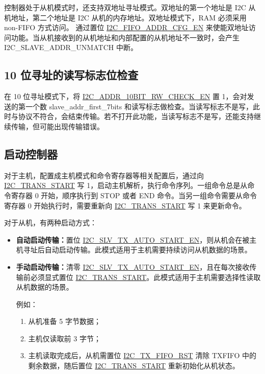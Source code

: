\documentclass[main\_\_CN.tex]{subfiles}
\begin{document}
控制器处于从机模式时，还支持双地址寻址模式。双地址的第一个地址是 I2C 从机地址，第二个地址是 I2C 从机的内存地址。双地址模式下，RAM 必须采用 non-FIFO 方式访问。
通过置位 \hyperref[fielddesc:I2CFIFOADDRCFGEN]{I2C\_FIFO\_ADDR\_CFG\_EN} 来使能双地址访问功能。当从机接收到的从机地址和内部配置的从机地址不一致时，会产生 I2C\_SLAVE\_ADDR\_UNMATCH 中断。
 
\subsection{10 位寻址的读写标志位检查}
在 10 位寻址模式下，将 \hyperref[fielddesc:I2CADDR10BITRWCHECKEN]{I2C\_ADDR\_10BIT\_RW\_CHECK\_EN} 置 1，会对发送的第一个数 slave\_addr\_first\_7bits 和读写标志做检查。当读写标志不是写，此时与协议不符合，会结束传输。若不打开此功能，当读写标志不是写，还能支持继续传输，但可能出现传输错误。

\subsection{启动控制器}
\label{subsubsec:i2c-start}
对于主机，配置成主机模式和命令寄存器等相关配置后，通过向 \hyperref[fielddesc:I2CTRANSSTART]{I2C\_TRANS\_START} 写 1，启动主机解析，执行命令序列。一组命令总是从命令寄存器 0 开始，顺序执行到 STOP 或者 END 命令。当另一组命令需要从命令寄存器 0 开始执行时，需要重新向 \hyperref[fielddesc:I2CTRANSSTART]{I2C\_TRANS\_START} 写 1 来更新命令。

对于从机，有两种启动方式：
\begin{itemize}
    \item \textbf{自动启动传输：}置位 \hyperref[fielddesc:I2CSLVTXAUTOSTARTEN]{I2C\_SLV\_TX\_AUTO\_START\_EN}，则从机会在被主机寻址后自动启动传输。此模式适用于主机需要持续访问从机数据的场景。
    \item \textbf{手动启动传输：}清零 \hyperref[fielddesc:I2CSLVTXAUTOSTARTEN]{I2C\_SLV\_TX\_AUTO\_START\_EN}，且在每次接收传输前必须显式置位 \hyperref[fielddesc:I2CTRANSSTART]{I2C\_TRANS\_START}。此模式适用于主机需要选择性读取从机数据的场景。

例如：
\begin{enumerate}
\item 从机准备 5 字节数据；
\item 主机仅读取前 3 字节；
\item 主机读取完成后，从机需置位 \hyperref[fielddesc:I2CTXFIFORST]{I2C\_TX\_FIFO\_RST} 清除 TXFIFO 中的剩余数据，随后置位 \hyperref[fielddesc:I2CTRANSSTART]{I2C\_TRANS\_START} 重新初始化从机状态。
\end{enumerate}

\end{itemize}
\end{document}
